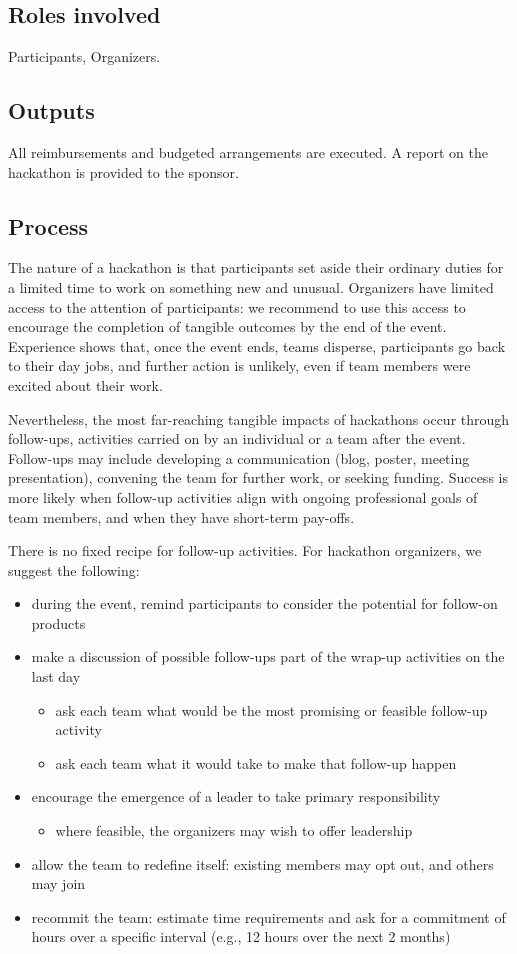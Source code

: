 \documentclass[11pt]{article}
\begin{document}
\subsection{Roles involved}
Participants, Organizers. 
\subsection{Outputs}
All reimbursements and budgeted arrangements are executed. A report on the hackathon is provided to the sponsor.  
\subsection{Process}
The nature of a hackathon is that participants set aside their ordinary duties for a limited time to work on something new and unusual.  Organizers have limited access to the attention of participants: we recommend to use this access to encourage the completion of tangible outcomes by the end of the event.  Experience shows that, once the event ends, teams disperse, participants go back to their day jobs, and further action is unlikely, even if team members were excited about their work.   

Nevertheless, the most far-reaching tangible impacts of hackathons occur through follow-ups, activities carried on by an individual or a team after the event.  Follow-ups may include developing a communication (blog, poster, meeting presentation), convening the team for further work, or seeking funding.  Success is more likely when follow-up activities align with ongoing professional goals of team members, and when they have short-term pay-offs.  

There is no fixed recipe for follow-up activities.  For hackathon organizers, we suggest the following: 
\begin{itemize}
\item during the event, remind participants to consider the potential for follow-on products
\item make a discussion of possible follow-ups part of the wrap-up activities on the last day
\begin{itemize}
\item  ask each team what would be the most promising or feasible follow-up activity
\item  ask each team what it would take to make that follow-up happen
\end{itemize}
\item  encourage the emergence of a leader to take primary responsibility
\begin{itemize}
\item  where feasible, the organizers may wish to offer leadership
\end{itemize}
\item  allow the team to redefine itself: existing members may opt out, and others may join
\item  recommit the team: estimate time requirements and ask for a commitment of hours over a specific interval (e.g., 12 hours over the next 2 months)
\end{itemize}
\end{document}
